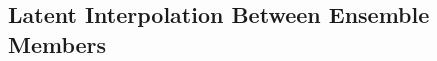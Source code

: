 \documentclass[11pt]{article}
\begin{document}


\subsection{Latent Interpolation Between Ensemble Members}
\end{document}
